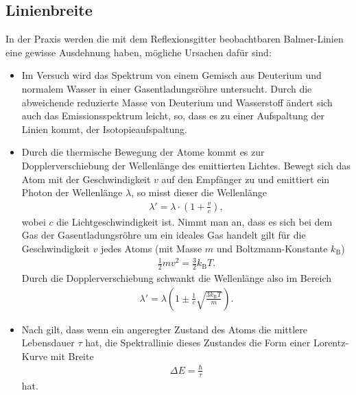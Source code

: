 \subsection{Linienbreite}
In der Praxis werden die mit dem Reflexionsgitter beobachtbaren Balmer-Linien eine gewisse Ausdehnung haben, mögliche Ursachen dafür sind:
\begin{itemize}
\item
Im Versuch wird das Spektrum von einem Gemisch aus Deuterium und normalem Wasser in einer Gasentladungsröhre untersucht. Durch die abweichende reduzierte Masse von Deuterium und Wasserstoff ändert sich auch das Emissionsspektrum leicht, so, dass es zu einer Aufspaltung der Linien kommt, der Isotopieaufspaltung.
\item    
Durch die thermische Bewegung der Atome kommt es zur Dopplerverschiebung der Wellenlänge des emittierten Lichtes. Bewegt sich das Atom mit der Geschwindigkeit $v$ auf den Empfänger zu und emittiert ein Photon der Wellenlänge $\lambda$, so misst dieser die Wellenlänge 
\begin{align*}
  \lambda'=\lambda \cdot \left(  1+ \frac{v}{c} \right),
\end{align*} 
wobei $c$ die Lichtgeschwindigkeit ist. Nimmt man an, dass es sich bei dem Gas der Gasentladungsröhre um ein ideales Gas handelt gilt für die Geschwindigkeit $v$ jedes Atoms (mit Masse $m$ und Boltzmann-Konstante $k_\mathrm{B}$)
\begin{align*}
  \frac{1}{2} m v^2=\frac{3}{2} k_\mathrm{B} T.
\end{align*}
Durch die Dopplerverschiebung schwankt die Wellenlänge also im Bereich
\begin{align}
  \lambda'=\lambda\left(1 \pm \frac{1}{c}\sqrt{\frac{3k_\mathrm{B}T}{m}} \right).
\end{align}
\item
Nach \cite{unschaerfe} gilt, dass wenn ein angeregter Zustand des Atoms die mittlere Lebensdauer $\tau$ hat, die Spektrallinie dieses Zustandes die Form einer Lorentz-Kurve mit Breite 
\begin{align}
  \Delta E=\frac{\hbar}{\tau}
\end{align}
hat.
\end{itemize}